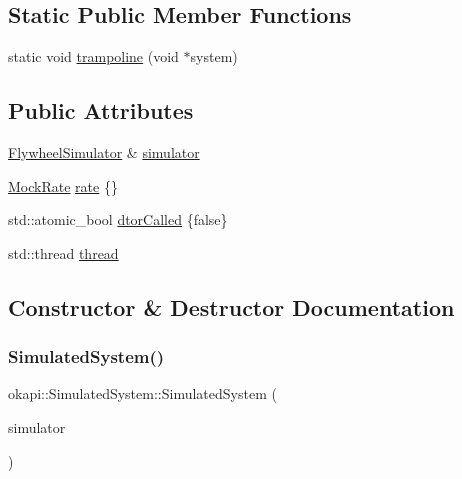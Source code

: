 \subsection*{Static Public Member Functions}
\begin{DoxyCompactItemize}
\item 
static void \mbox{\hyperlink{classokapi_1_1SimulatedSystem_a4f1883220269213856da5b4ffa81faa4}{trampoline}} (void $\ast$system)
\end{DoxyCompactItemize}
\subsection*{Public Attributes}
\begin{DoxyCompactItemize}
\item 
\mbox{\hyperlink{classokapi_1_1FlywheelSimulator}{Flywheel\+Simulator}} \& \mbox{\hyperlink{classokapi_1_1SimulatedSystem_a8a0976ed11f951daf4edbca13e0fa6a5}{simulator}}
\item 
\mbox{\hyperlink{classokapi_1_1MockRate}{Mock\+Rate}} \mbox{\hyperlink{classokapi_1_1SimulatedSystem_a476dcbc29e5b7f6183cba06093fc1733}{rate}} \{\}
\item 
std\+::atomic\+\_\+bool \mbox{\hyperlink{classokapi_1_1SimulatedSystem_a406c9f056a0c7aa4d18c572039bd3e28}{dtor\+Called}} \{false\}
\item 
std\+::thread \mbox{\hyperlink{classokapi_1_1SimulatedSystem_a96840ae0f377de974e33f3d400f94205}{thread}}
\end{DoxyCompactItemize}


\subsection{Constructor \& Destructor Documentation}
\mbox{\label{classokapi_1_1SimulatedSystem_ad0f05b4fb5112a490493040b11b8bea3}} 
\subsubsection{\texorpdfstring{SimulatedSystem()}{SimulatedSystem()}}
{\footnotesize\ttfamily okapi\+::\+Simulated\+System\+::\+Simulated\+System (\begin{DoxyParamCaption}\item[{\mbox{\hyperlink{classokapi_1_1FlywheelSimulator}{Flywheel\+Simulator}} \&}]{simulator }\end{DoxyParamCaption})\hspace{0.3cm}{\ttfamily [explicit]}}

